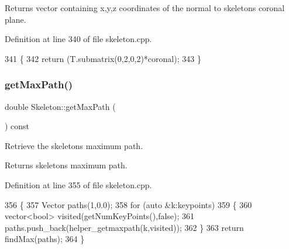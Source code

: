\begin{DoxyReturn}{Returns}
vector containing x,y,z coordinates of the normal to skeleton\textquotesingle{}s coronal plane. 
\end{DoxyReturn}


Definition at line 340 of file skeleton.\+cpp.


\begin{DoxyCode}
341 \{
342     \textcolor{keywordflow}{return} (T.submatrix(0,2,0,2)*coronal);
343 \}
\end{DoxyCode}
\mbox{\label{classassistive__rehab_1_1Skeleton_acda9030cd2ed3ad92697418a5e2cff7c}} 
\subsubsection{\texorpdfstring{get\+Max\+Path()}{getMaxPath()}}
{\footnotesize\ttfamily double Skeleton\+::get\+Max\+Path (\begin{DoxyParamCaption}{ }\end{DoxyParamCaption}) const\hspace{0.3cm}{\ttfamily [inherited]}}



Retrieve the skeleton\textquotesingle{}s maximum path. 

\begin{DoxyReturn}{Returns}
skeleton\textquotesingle{}s maximum path. 
\end{DoxyReturn}


Definition at line 355 of file skeleton.\+cpp.


\begin{DoxyCode}
356 \{
357     Vector paths(1,0.0);
358     \textcolor{keywordflow}{for} (\textcolor{keyword}{auto} &k:keypoints)
359     \{
360         vector<bool> visited(getNumKeyPoints(),\textcolor{keyword}{false});
361         paths.push\_back(helper\_getmaxpath(k,visited));
362     \}
363     \textcolor{keywordflow}{return} findMax(paths);
364 \}
\end{DoxyCode}
\mbox{\label{classassistive__rehab_1_1Skeleton_a954bfa99e0dad997ca6d93495246d3f1}} 
